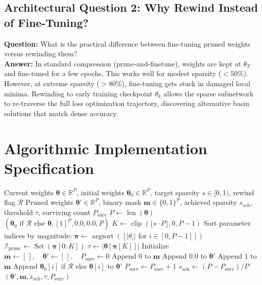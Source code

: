 \documentclass[11pt,a4paper]{article}
\theoremstyle{definition}
\begin{document}
\subsection{Architectural Question 2: Why Rewind Instead of Fine-Tuning?}
\textbf{Question:} What is the practical difference between fine-tuning pruned weights versus rewinding them?\\
\textbf{Answer:} In standard compression (prune-and-finetune), weights are kept at $\theta_T$ and fine-tuned for a few epochs. This works well for modest sparsity ($<50\%$). However, at extreme sparsity ($>80\%$), fine-tuning gets stuck in damaged local minima. Rewinding to early training checkpoint $\theta_k$ allows the sparse subnetwork to re-traverse the full loss optimization trajectory, discovering alternative basin solutions that match dense accuracy.

\section{Algorithmic Implementation Specification}

\begin{algorithm}[H]
\caption{Iterative Magnitude Pruning with Weight Rewinding}
\begin{algorithmic}[1]
\Require Current weights $\boldsymbol{\theta} \in \mathbb{R}^P$, initial weights $\boldsymbol{\theta}_0 \in \mathbb{R}^P$, target sparsity $s \in [0, 1)$, rewind flag $\mathcal{R}$
\Ensure Pruned weights $\boldsymbol{\theta}' \in \mathbb{R}^P$, binary mask $\mathbf{m} \in \{0, 1\}^P$, achieved sparsity $s_{\text{ach}}$, threshold $\tau$, surviving count $P_{\text{surv}}$
\State $P \gets \operatorname{len}(\boldsymbol{\theta})$
    \State \Return $(\boldsymbol{\theta}_0 \text{ if } \mathcal{R} \text{ else } \boldsymbol{\theta}, [1]^P, 0.0, 0.0, P)$
\EndIf
\State $K \gets \operatorname{clip}(\lfloor s \cdot P \rfloor, 0, P - 1)$
\State Sort parameter indices by magnitude: $\boldsymbol{\pi} \gets \operatorname{argsort}([|\theta_i| \text{ for } i \in [0, P-1]])$
\State $\mathcal{I}_{\text{prune}} \gets \operatorname{Set}(\boldsymbol{\pi}[0 : K])$
\State $\tau \gets |\boldsymbol{\theta}[\boldsymbol{\pi}[K]]|$
\State Initialize $\mathbf{m} \gets [\,], \quad \boldsymbol{\theta}' \gets [\,], \quad P_{\text{surv}} \gets 0$
        \State Append $0$ to $\mathbf{m}$
        \State Append $0.0$ to $\boldsymbol{\theta}'$
    \Else
        \State Append $1$ to $\mathbf{m}$
        \State Append $\boldsymbol{\theta}_0[i]$ if $\mathcal{R}$ else $\boldsymbol{\theta}[i]$ to $\boldsymbol{\theta}'$
        \State $P_{\text{surv}} \gets P_{\text{surv}} + 1$
    \EndIf
\EndFor
\State $s_{\text{ach}} \gets (P - P_{\text{surv}}) / P$
\State \Return $(\boldsymbol{\theta}', \mathbf{m}, s_{\text{ach}}, \tau, P_{\text{surv}})$
\end{algorithmic}
\end{algorithm}
\end{document}
